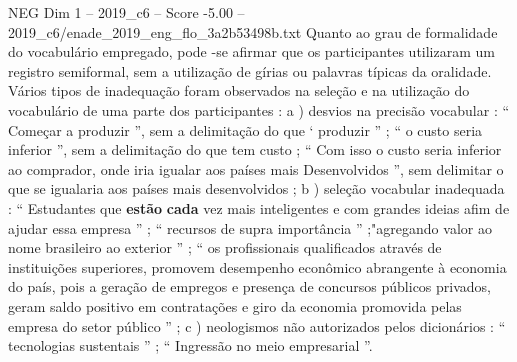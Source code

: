 \begin{textsample}{NEG Dim 1 – 2019\_c6 – Score -5.00 – 2019\_c6/enade\_2019\_eng\_flo\_3a2b53498b.txt}
Quanto ao grau de formalidade do vocabulário empregado, pode -se afirmar que os participantes utilizaram um registro semiformal, sem a utilização de gírias ou palavras típicas da oralidade.
Vários tipos de inadequação foram observados na seleção e na utilização do vocabulário de uma parte dos participantes : a ) desvios na precisão vocabular : “ Começar a produzir ”, sem a delimitação do que ‘ produzir ” ; “ o custo seria inferior ”, sem a delimitação do que tem custo ; “ Com isso o custo seria inferior ao comprador, onde iria igualar aos países mais Desenvolvidos ”, sem delimitar o que se igualaria aos países mais desenvolvidos ; b ) seleção vocabular inadequada : “ Estudantes que \textbf{estão} \textbf{cada} vez mais inteligentes e com grandes ideias afim de ajudar essa empresa ” ; “ recursos de supra importância ” ;"agregando valor ao nome brasileiro ao exterior ” ; “ os profissionais qualificados através de instituições superiores, promovem desempenho econômico abrangente à economia do país, pois a geração de empregos e presença de concursos públicos privados, geram saldo positivo em contratações e giro da economia promovida pelas empresa do setor público ” ; c ) neologismos não autorizados pelos dicionários : “ tecnologias sustentais ” ; “ Ingressão no meio empresarial ”.

\end{textsample}
